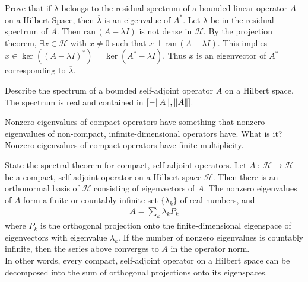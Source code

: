 \documentclass[avery5388,grid,frame]{flashcards}
\newcommand{\ran}{\mathrm{ran}\,}
\newcommand{\f}[3]{#1\ :\ #2 \rightarrow #3}
\def\hilb{\mathcal{H}}
\begin{document}
\begin{flashcard}
    {Prove that if $\lambda$ belongs to the residual spectrum of a bounded linear operator $A$ on a Hilbert Space, then $\overline{\lambda}$ is an eigenvalue of $A^*$.}
    Let $\lambda$ be in the residual spectrum of $A$.  Then $\ran (A - \lambda I)$ is not dense in $\hilb$.  By the projection theorem, $\exists x \in \hilb$ with $x \neq 0$ such that $x \perp \ran (A - \lambda I)$.  This implies $x \in \ker ((A - \lambda I)^*) = \ker (A^* - \overline{\lambda} I)$.  Thus $x$ is an eigenvector of $A^*$ corresponding to $\overline{\lambda}$.
\end{flashcard}

\begin{flashcard}
    {Describe the spectrum of a bounded self-adjoint operator $A$ on a Hilbert space.}
    The spectrum is real and contained in $[-\norm{A}, \norm{A}]$.
\end{flashcard}

\begin{flashcard}
    {Nonzero eigenvalues of compact operators have something that nonzero eigenvalues of non-compact, infinite-dimensional operators have.  What is it?}
    Nonzero eigenvalues of compact operators have finite multiplicity.
\end{flashcard}

\begin{flashcard}
    {State the spectral theorem for compact, self-adjoint operators.}
    Let $\f{A}{\hilb}{\hilb}$ be a compact, self-adjoint operator on a Hilbert space $\hilb$.  Then there is an orthonormal basis of $\hilb$ consisting of eigenvectors of $A$.  The nonzero eigenvalues of $A$ form a finite or countably infinite set $\{\lambda_k\}$ of real numbers, and
    \begin{align*}
        A = \sum_k \lambda_k P_k
    \end{align*}
    where $P_k$ is the orthogonal projection onto the finite-dimensional eigenspace of eigenvectors with eigenvalue $\lambda_k$.  If the number of nonzero eigenvalues is countably infinite, then the series above converges to $A$ in the operator norm. \\

    In other words, every compact, self-adjoint operator on a Hilbert space can be decomposed into the sum of orthogonal projections onto its eigenspaces.
\end{flashcard}
\end{document}
